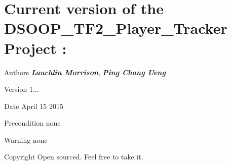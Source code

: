  \hypertarget{index_version}{}\section{Current version of the D\+S\+O\+O\+P\+\_\+\+T\+F2\+\_\+\+Player\+\_\+\+Tracker Project \+:}\label{index_version}

\begin{DoxyItemize}
\item \begin{DoxyAuthor}{Authors}
{\bfseries {\itshape Lauchlin Morrison}}, {\bfseries {\itshape Ping Chang Ueng}} 
\end{DoxyAuthor}

\item \begin{DoxyVersion}{Version}
1... 
\end{DoxyVersion}

\item \begin{DoxyDate}{Date}
April 15 2015 
\end{DoxyDate}

\item \begin{DoxyPrecond}{Precondition}
none 
\end{DoxyPrecond}

\item \begin{DoxyWarning}{Warning}
none 
\end{DoxyWarning}

\item \begin{DoxyCopyright}{Copyright}
Open sourced. Feel free to take it. 
\end{DoxyCopyright}

\end{DoxyItemize}